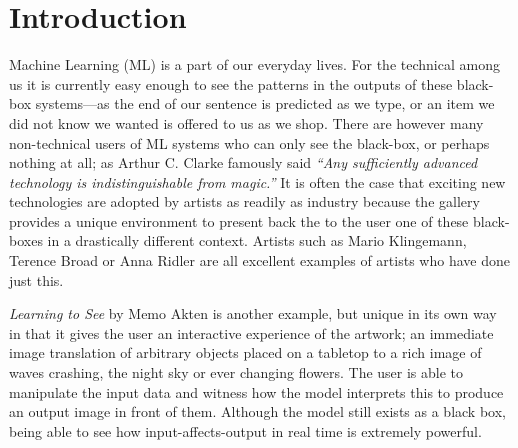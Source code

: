\documentclass{article}
\begin{document}

\clearpage

\section{Introduction}
Machine Learning (ML) is a part of our everyday lives. For the technical among us it is currently easy enough to see the patterns in the outputs of these black-box systems---as the end of our sentence is predicted as we type, or an item we did not know we wanted is offered to us as we shop. There are however many non-technical users of ML systems who can only see the black-box, or perhaps nothing at all; as Arthur C. Clarke famously said \textit{``Any sufficiently advanced technology is indistinguishable from magic.''}\cite{toffler_1972} It is often the case that exciting new technologies are adopted by artists as readily as industry because the gallery provides a unique environment to present back the to the user one of these black-boxes in a drastically different context. Artists such as Mario Klingemann\cite{mario_klingemann}, Terence Broad\cite{terry_broad} or Anna Ridler\cite{anna_ridler} are all excellent examples of artists who have done just this.

\textit{Learning to See} by Memo Akten\cite{lts_memo} is another example, but unique in its own way in that it gives the user an interactive experience of the artwork; an immediate image translation of arbitrary objects placed on a tabletop to a rich image of waves crashing, the night sky or ever changing flowers. The user is able to manipulate the input data and witness how the model interprets this to produce an output image in front of them. Although the model still exists as a black box, being able to see how input-affects-output in real time is extremely powerful.
\end{document}
